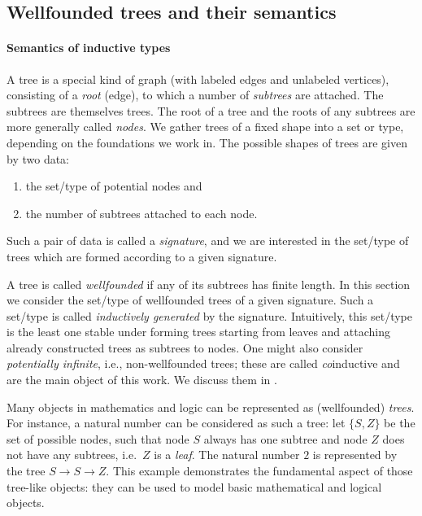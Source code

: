 \documentclass[a4paper,USenglish]{lipics}
\begin{document}
\begin{Long}
 \subsection{Wellfounded trees and their semantics}\label{sec:sem_ind}
\end{Long}
\begin{Short}
 \paragraph*{Semantics of inductive types}
\end{Short}
 
 A tree is a special kind of graph (with labeled edges and unlabeled vertices), consisting of a \emph{root} (edge), 
 to which a number of \emph{subtrees} are attached. 
 The subtrees are themselves trees.
 The root of a tree and the roots of any subtrees are more generally called \emph{nodes}.
 We gather trees of a fixed shape into a set or type, depending on the foundations we work in. 
 The possible shapes of trees are given by two data:
 \begin{enumerate}
  \item the set/type of potential nodes and
  \item the number of subtrees attached to each node.
 \end{enumerate}
 Such a pair of data is called a \emph{signature}, and we are interested in the set/type of trees which are formed according to a given signature.
 
 A tree is called \emph{wellfounded} if any of its subtrees has finite length. In this section we consider the set/type of wellfounded trees of 
 a given signature. Such a set/type is called \emph{inductively generated} by the signature. Intuitively, this set/type is the least one stable under
 forming trees starting from leaves and attaching already constructed trees as subtrees to nodes.
 One might also consider \emph{potentially infinite}, i.e., non-wellfounded trees; these are called \emph{co}inductive and are the main object of this work.
 We discuss them in .
 
 
 Many objects in mathematics and logic can be represented as (wellfounded) \emph{trees}.
 For instance, a natural number can be considered as such a tree: let $\{S,Z\}$ be the set of possible nodes, 
 such that node $S$ always has one subtree and node $Z$ does not have any subtrees, i.e.\ $Z$ is a \emph{leaf}.
 The natural number $2$ is represented by the tree $S\longrightarrow S\longrightarrow Z$. 
 This example demonstrates the fundamental aspect of those tree-like objects: they can be used to model basic mathematical and logical objects.
 
\end{document}
